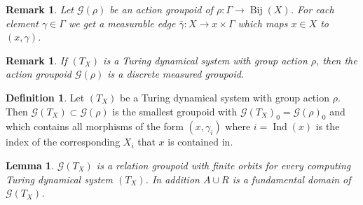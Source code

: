 \documentclass[12pt,a4paper]{scrartcl}
\theoremstyle{plain}
\newtheorem{Lemma}[Theorem]{Lemma}
\newtheorem{Remark}[Theorem]{Remark}
\theoremstyle{definition}
\newtheorem{Definition}[Theorem]{Definition}
\numberwithin{equation}{section}
\newcommand{\2}{\mathbb{Z} / 2 \mathbb{Z}}
\newcommand{\G}{\mathcal{G}}
\newcommand{\1}{\bar{1}}
\newcommand{\0}{\bar{0}}
\newcommand{\Bij}{\operatorname{Bij}}
\newcommand{\Ind}{\operatorname{Ind}}
\begin{document}
\begin{Remark} \label{mE_action_groupoid}
	Let $\G(\rho)$ be an action groupoid of $\rho \colon \Gamma \to \Bij(X)$. For each element $\gamma \in \Gamma$ we get a measurable edge $\bar{\gamma}\colon X \to x \times \Gamma$ which maps $x \in X$ to $(x, \gamma)$.
\end{Remark}



\begin{Remark}
	If $(T_X)$ is a Turing dynamical system with group action $\rho$, then the action groupoid $\G(\rho)$ is a discrete measured groupoid.
\end{Remark}
\begin{Definition}
	Let $(T_X)$ be a Turing dynamical system with group action $\rho$. Then $\G (T_X) \subset \G(\rho)$ is the smallest groupoid with $\G (T_X)_0 = \G(\rho)_0$ and which contains all morphisms of the form $(x, \gamma_i)$ where $i = \Ind(x)$ is the index of the corresponding $X_i$ that $x$ is contained in.
\end{Definition}
\begin{Lemma} \label{TX_rel_groupoid}
	$\G (T_X)$ is a relation groupoid with finite orbits for every computing Turing dynamical system $(T_X)$. In addition $A \cup R$ is a fundamental domain of $\G (T_X)$.
\end{Lemma}
\end{document}

